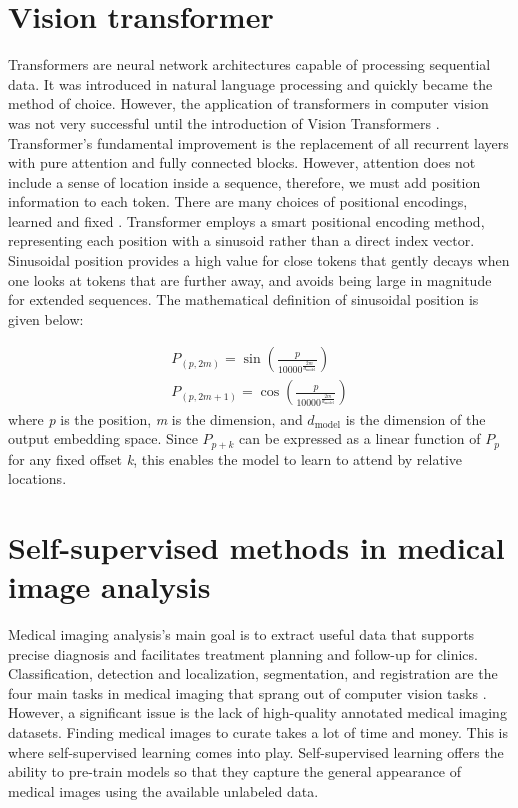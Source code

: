 \documentclass[11pt,titlepage,openright]{book}
\begin{document}
\section{Vision transformer}
Transformers \citep{vaswani2017attention} are neural network architectures capable of processing sequential data. It was introduced in natural language processing and quickly became the method of choice. However, the application of transformers in computer vision was not very successful until the introduction of Vision Transformers \citep{dosovitskiy2020image}. Transformer's fundamental improvement is the replacement of all recurrent layers with pure attention and fully connected blocks. However, attention does not include a sense of location inside a sequence, therefore, we must add position information to each token. There are many choices of positional encodings, learned and fixed \citep{gehring2017convolutional}. Transformer employs a smart positional encoding method, representing each position with a sinusoid rather than a direct index vector. Sinusoidal position \citep{vaswani2017attention} provides a high value for close tokens that gently decays when one looks at tokens that are further away, and avoids being large in magnitude for extended sequences. The mathematical definition of sinusoidal position is given below:

\begin{gather*}
    P_{(p, 2m)} = \sin \left(\frac{p}{10000 ^ {\frac{2m}{d_{\text{model}}}}}\right) \\
    P_{(p, 2m+1)} = \cos \left(\frac{p}{10000 ^ {\frac{2m}{d_{\text{model}}}}}\right)
\end{gather*}
where \textit{p} is the position, \textit{m} is the dimension, and \(\textit{d}_{\text{model}}\) is the dimension of the output embedding space. Since \(P_{p+k}\) can be expressed as a linear function of \(P_{p}\) for any fixed offset \textit{k}, this enables the model to learn to attend by relative locations.


\section{Self-supervised methods in medical image analysis}
\label{subsec:ssl-medical-imageing}
Medical imaging analysis's main goal is to extract useful data that supports precise diagnosis \citep{anwar2018medical} and facilitates treatment planning and follow-up for clinics. Classification, detection and localization, segmentation, and registration are the four main tasks in medical imaging that sprang out of computer vision tasks \citep{altaf2019going}. However, a significant issue is the lack of high-quality annotated medical imaging datasets. Finding medical images to curate takes a lot of time and money. This is where self-supervised learning comes into play. Self-supervised learning offers the ability to pre-train models so that they capture the general appearance of medical images using the available unlabeled data.
\end{document}
